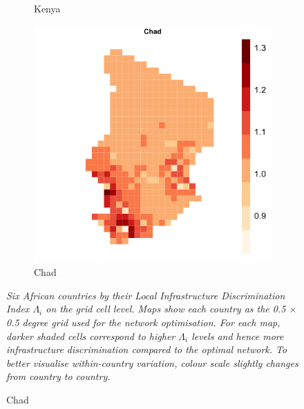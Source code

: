 \documentclass[11pt, oneside]{article}   	%
\newcommand{\mysubcaption}[1]{
\justify
\begin{spacing}{0.7}
\textit{\footnotesize #1}
\end{spacing}}
\begin{document}
\begin{figure}[!ph]
\begin{subfigure}[c]{0.32\textwidth}
\caption{Kenya}
\label{fig:Kenya_zeta}
\end{subfigure}
\begin{subfigure}[c]{0.32\textwidth}
\includegraphics[width=\textwidth]{../../Analysis/output/zeta_heatmaps/Chad_zeta.png}
\caption{Chad}
\label{fig:Chad_zeta}
\end{subfigure}



\label{fig:zeta_countries}
\mysubcaption{Six African countries by their Local Infrastructure Discrimination Index $\Lambda_{i}$ on the grid cell level. Maps show each country as the 0.5 $\times$ 0.5 degree grid used for the network optimisation. For each map, darker shaded cells correspond to higher $\Lambda_{i}$ levels and hence more infrastructure discrimination compared to the optimal network. To better visualise within-country variation, colour scale slightly changes from country to country.}
\end{figure}
\vspace*{\fill}
\end{document}
